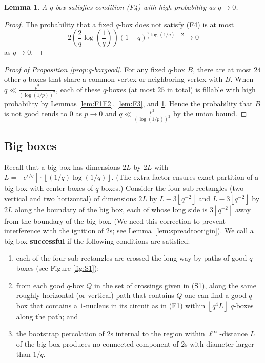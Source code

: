 \documentclass{article}
\newcommand{\floor}[1]{\left\lfloor#1\right \rfloor}
\numberwithin{equation}{section}
\newtheorem{lemma}[theorem]{Lemma}
\begin{document}
\begin{lemma}\label{lem:F4}
    A $q$-box satisfies condition (F4) with high probability as $q \to 0$.
\end{lemma}
\begin{proof}
    The probability that a fixed $q$-box does not satisfy (F4) is at most
    \[
    2\left(\frac{2}{q}\log\left(\frac{1}{q}\right)\right) (1 - q)^{\frac{2}{q}\log(1/q) - 2} \to 0
    \]
    as $q \to 0$.
\end{proof}

\begin{proof}[Proof of Proposition \ref{prop:q-boxgood}]
    For any fixed $q$-box $B$, there are at most $24$ other $q$-boxes that share a common vertex or neighboring vertex with $B$.
    When $q \ll \frac{p^2}{(\log(1/p))^2}$, each of these $q$-boxes (at most $25$ in total) is fillable with high probability by Lemmas \ref{lem:F1F2}, \ref{lem:F3}, and \ref{lem:F4}.
    Hence the probability that $B$ is not good tends to $0$ as $p \to 0$ and $q \ll \frac{p^2}{(\log(1/p))^2}$ by the union bound. 
\end{proof}

\subsection{Big boxes}

Recall that a big box has dimensions $2L$ by $2L$ with $L = \floor{e^{\epsilon/q}}\cdot \floor{(1/q)\log(1/q)}$.
(The extra factor ensures exact partition of a big box with center boxes of $q$-boxes.)
Consider the four sub-rectangles (two vertical and two horizontal) of dimensions $2L$ by $L - 3\floor{q^{-2}}$ and $L - 3\floor{q^{-2}}$ by $2L$ along the boundary of the big box, each of whose long side is $3\floor{q^{-2}}$ away from the boundary of the big box. (We need this correction to prevent interference with the ignition of $2$s; see Lemma~\ref{lem:spreadtoorigin}).
We call a big box \textbf{successful} if the following conditions are satisfied:
\begin{enumerate}
    \item[(S1)] 
    each of the four sub-rectangles are crossed the long way by paths of good $q$-boxes (see Figure \ref{fig:S1});
    
    \item[(S2)] 
   from each good $q$-box $Q$ in the set of crossings given in (S1), along the same roughly horizontal (or vertical) path that contains $Q$ one can find a good $q$-box that contains a $1$-nucleus in its circuit as in (F1) within $\floor{q^4 L}$ $q$-boxes along the path; and
    
    \item[(S3)] 
    the bootstrap percolation of $2$s internal to the region within  $\ell^\infty$-distance $L$ of the big box produces no connected component of $2$s with diameter larger than $1/q$.
\end{enumerate}
\end{document}
